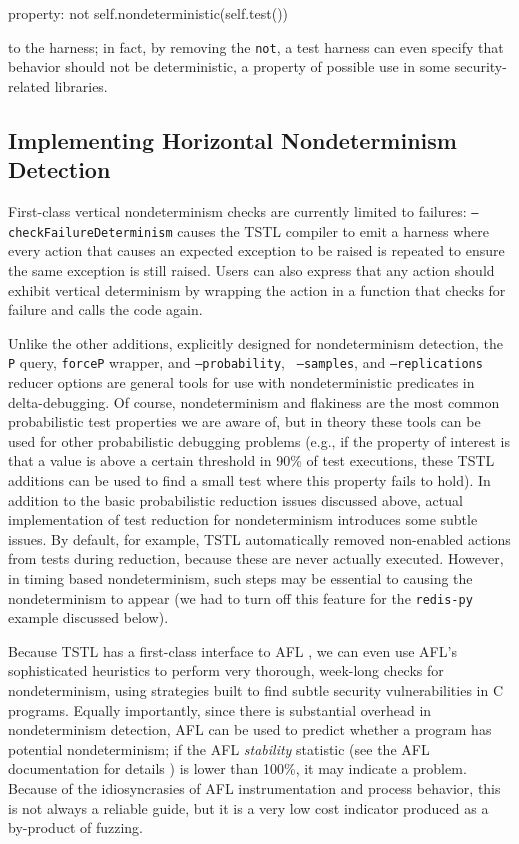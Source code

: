 {\scriptsize
\begin{code}
property: not self.nondeterministic(self.test())
\end{code}
}

\noindent to the harness; in fact, by removing the {\tt not}, a test harness can
even specify that behavior should not be deterministic, a property of
possible use in some security-related libraries.

\subsection{Implementing Horizontal Nondeterminism Detection}

First-class vertical nondeterminism checks are currently
limited to failures:  {\tt --checkFailureDeterminism} causes the TSTL
compiler to emit a harness where every action that causes an expected
exception to be raised is repeated to ensure the same exception is
still raised.  Users can also express that any action should exhibit
vertical determinism by wrapping the action in a function that checks
for failure and calls the code again.

Unlike the other additions, explicitly designed for nondeterminism
detection, the {\tt P} query, {\tt forceP} wrapper, and {\tt --probability}, {\tt
  --samples}, and {\tt --replications} reducer options are general
tools for use with nondeterministic predicates in delta-debugging.  Of
course, nondeterminism and flakiness are the most common probabilistic
test properties we are aware of, but in theory these tools can be used
for other probabilistic debugging problems (e.g., if the property of
interest is that a value is above a certain threshold in 90\% of test
executions, these TSTL additions can be used to find a small test where this property
fails to hold).  In addition to the basic probabilistic reduction
issues discussed above, actual implementation of test reduction for
nondeterminism introduces some subtle issues.  By default, for
example, TSTL automatically removed non-enabled actions from tests
during reduction, because these are never actually executed.  However,
in timing based nondeterminism, such steps may be essential to
causing the nondeterminism to appear (we had to turn off this feature
for the {\tt redis-py} example discussed below).

Because TSTL has a first-class interface to AFL \cite{aflfuzz}, we can even use
AFL's sophisticated heuristics to perform very thorough, week-long
checks for nondeterminism, using strategies built to find subtle
security vulnerabilities in C programs.  Equally importantly, since
there is substantial overhead in nondeterminism detection, AFL can be
used to predict whether a program has potential nondeterminism; if the
AFL \emph{stability} statistic (see the AFL documentation for details
\cite{aflfuzz}) is lower than 100\%, it may indicate a problem.
Because of the idiosyncrasies of AFL instrumentation and process
behavior, this is not always a reliable guide, but it is a very low
cost indicator produced as a by-product of fuzzing.